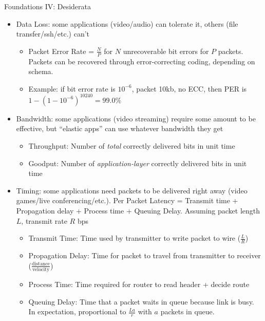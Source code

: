 \documentclass{beamer}
\begin{document}
\begin{frame}[t]{Foundations IV: Desiderata}
    \begin{itemize}
        \item \alert{Data Loss}: some applications (video/audio) can tolerate it, others (file transfer/ssh/etc.) can't
        \begin{itemize}
            \item \pause \alert{Packet Error Rate} = $\frac{N}{P}$ for $N$ unrecoverable bit errors for $P$ packets. Packets can be recovered through error-correcting coding, depending on schema. 
            \item \pause Example: if bit error rate is $10^{-6}$, packet 10kb, no ECC, then PER is $1-(1-10^{-6})^{10240} = 99.0\%$
        \end{itemize}
        \item \pause \alert{Bandwidth}: some applications (video streaming) require some amount to be effective, but ``elastic apps'' can use whatever bandwidth they get
        \begin{itemize}
            \item \pause \alert{Throughput}: Number of \textit{total} correctly delivered bits in unit time
            \item \pause \alert{Goodput}: Number of \textit{application-layer} correctly delivered bits in unit time
        \end{itemize}
        \item \pause \alert{Timing}: some applications need packets to be delivered right away (video games/live conferencing/etc.). \alert{Per Packet Latency} = Transmit time + Propagation delay + Process time + Queuing Delay. Assuming packet length $L$, transmit rate $R$ bps
        \begin{itemize}
            \item \pause \alert{Transmit Time}: Time used by transmitter to write packet to wire ($\frac{L}{R}$)
            \item \pause \alert{Propagation Delay}: Time for packet to travel from transmitter to receiver ($\frac{\text{distance}}{\text{velocity}}$)
            \item \pause \alert{Process Time}: Time required for router to read header + decide route
            \item \pause \alert{Queuing Delay}: Time that a packet waits in queue because link is busy. In expectation, proportional to $\frac{La}{r}$ with $a$ packets in queue.
        \end{itemize}
    \end{itemize}
\end{frame}
\end{document}
